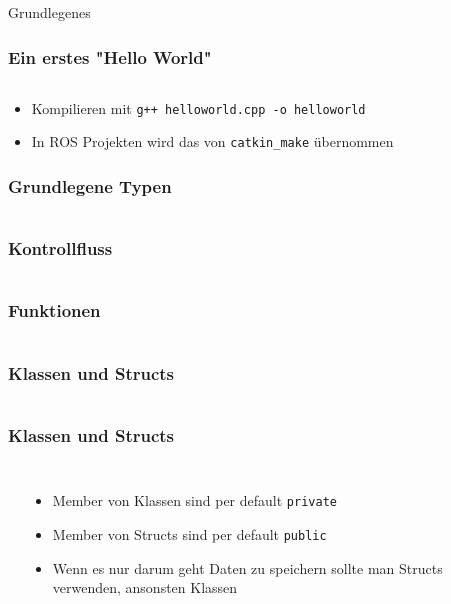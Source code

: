 \documentclass[plain]{beamer}
\begin{document}
\begin{frame}
  \center \huge Grundlegenes
\end{frame}

\begin{frame}[fragile]
  \frametitle{Ein erstes "Hello World"}
  \inputminted{cpp}{code/examples/helloworld.cpp}
  \begin{itemize}
    \item Kompilieren mit \texttt{g++ helloworld.cpp -o helloworld}
    \item In ROS Projekten wird das von \texttt{catkin\_make} übernommen
  \end{itemize}
\end{frame}

\begin{frame}[fragile]
  \frametitle{Grundlegene Typen}
  \inputminted{cpp}{code/examples/types.cpp}
\end{frame}

\begin{frame}[fragile]
  \frametitle{Kontrollfluss}
  \inputminted{cpp}{code/examples/fizzbuzz.cpp}
\end{frame}

\begin{frame}[fragile]
  \frametitle{Funktionen}
  \inputminted{cpp}{code/examples/functions.cpp}
\end{frame}

\begin{frame}[fragile]
  \frametitle{Klassen und Structs}
  \inputminted{cpp}{code/examples/classes.cpp}
\end{frame}

\begin{frame}[fragile]
  \frametitle{Klassen und Structs}
  \begin{columns}[onlytextwidth,T]
    \column{\dimexpr\linewidth-50mm-10mm}
    \inputminted{cpp}{code/examples/structs.cpp}
    \column{50mm}
    \begin{itemize}
      \item Member von Klassen sind per default \texttt{private}
      \item Member von Structs sind per default \texttt{public}
      \item Wenn es nur darum geht Daten zu speichern sollte man Structs verwenden, ansonsten
        Klassen
    \end{itemize}
  \end{columns}
\end{frame}
\end{document}
